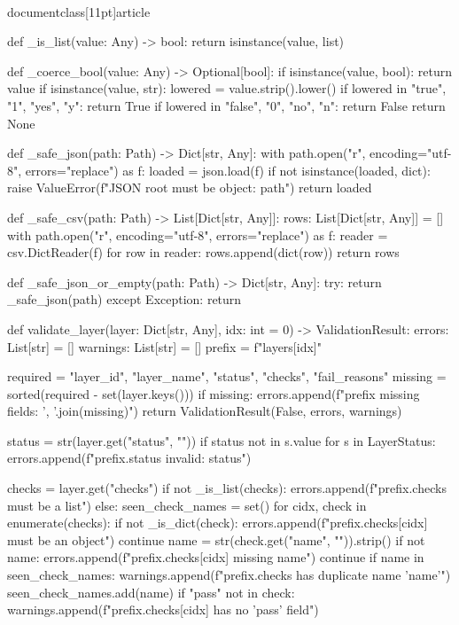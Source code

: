 \\documentclass[11pt]{article}
\begin{document}
\begin{CodeBlock}
def _is_list(value: Any) -> bool:
    return isinstance(value, list)


def _coerce_bool(value: Any) -> Optional[bool]:
    if isinstance(value, bool):
        return value
    if isinstance(value, str):
        lowered = value.strip().lower()
        if lowered in {"true", "1", "yes", "y"}:
            return True
        if lowered in {"false", "0", "no", "n"}:
            return False
    return None


def _safe_json(path: Path) -> Dict[str, Any]:
    with path.open("r", encoding="utf-8", errors="replace") as f:
        loaded = json.load(f)
    if not isinstance(loaded, dict):
        raise ValueError(f"JSON root must be object: {path}")
    return loaded


def _safe_csv(path: Path) -> List[Dict[str, Any]]:
    rows: List[Dict[str, Any]] = []
    with path.open("r", encoding="utf-8", errors="replace") as f:
        reader = csv.DictReader(f)
        for row in reader:
            rows.append(dict(row))
    return rows


def _safe_json_or_empty(path: Path) -> Dict[str, Any]:
    try:
        return _safe_json(path)
    except Exception:
        return {}


def validate_layer(layer: Dict[str, Any], idx: int = 0) -> ValidationResult:
    errors: List[str] = []
    warnings: List[str] = []
    prefix = f"layers[{idx}]"

    required = {"layer_id", "layer_name", "status", "checks", "fail_reasons"}
    missing = sorted(required - set(layer.keys()))
    if missing:
        errors.append(f"{prefix} missing fields: {', '.join(missing)}")
        return ValidationResult(False, errors, warnings)

    status = str(layer.get("status", ""))
    if status not in {s.value for s in LayerStatus}:
        errors.append(f"{prefix}.status invalid: {status}")

    checks = layer.get("checks")
    if not _is_list(checks):
        errors.append(f"{prefix}.checks must be a list")
    else:
        seen_check_names = set()
        for cidx, check in enumerate(checks):
            if not _is_dict(check):
                errors.append(f"{prefix}.checks[{cidx}] must be an object")
                continue
            name = str(check.get("name", "")).strip()
            if not name:
                errors.append(f"{prefix}.checks[{cidx}] missing name")
                continue
            if name in seen_check_names:
                warnings.append(f"{prefix}.checks has duplicate name '{name}'")
            seen_check_names.add(name)
            if "pass" not in check:
                warnings.append(f"{prefix}.checks[{cidx}] has no 'pass' field")


\end{CodeBlock}
\end{document}

